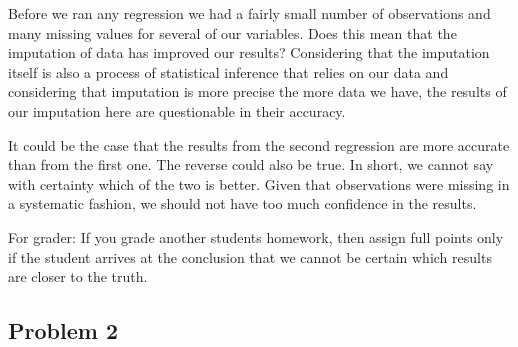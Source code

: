 \documentclass[12pt]{article}\usepackage[]{graphicx}\usepackage[]{color}
\begin{document}
Before we ran any regression we had a fairly small number of observations and many missing values for several of our variables. Does this mean that the imputation of data has improved our results? Considering that the imputation itself is also a process of statistical inference that relies on our data and considering that imputation is more precise the more data we have, the results of our imputation here are questionable in their accuracy.

It could be the case that the results from the second regression are more accurate than from the first one. The reverse could also be true. In short, we cannot say with certainty which of the two is better. Given that observations were missing in a systematic fashion, we should not have too much confidence in the results.

For grader: If you grade another students homework, then assign full points only if the student arrives at the conclusion that we cannot be certain which results are closer to the truth.



\subsection*{Problem 2}
\end{document}
